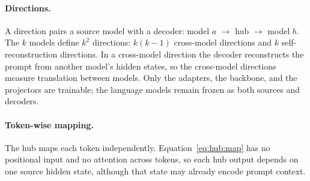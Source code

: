 \paragraph{Directions.} A direction pairs a source model with a decoder: model $a$ $\to$ hub $\to$ model $b$.
The $k$ models define $k^2$ directions: $k(k-1)$ cross-model directions and $k$ self-reconstruction directions.
In a cross-model direction the decoder reconstructs the prompt from another model's hidden states, so the cross-model directions measure translation between models.
Only the adapters, the backbone, and the projectors are trainable; the language models remain frozen as both sources and decoders.

\paragraph{Token-wise mapping.} The hub maps each token independently.
Equation~\ref{eq:hub:map} has no positional input and no attention across tokens, so each hub output depends on one source hidden state, although that state may already encode prompt context.

